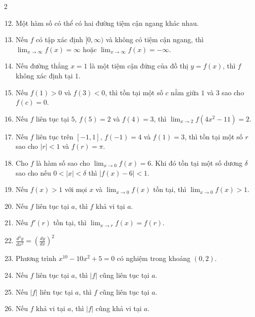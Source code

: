 \begin{multicols}{2}
\vspace{0.8em}

\begin{enumerate}[label=\textbf{\arabic*.}, leftmargin=1.8em, itemsep=1.1ex, topsep=0pt]
\setcounter{enumi}{11}
  \item Một hàm số có thể có hai đường tiệm cận ngang khác nhau.

  \item Nếu $f$ có tập xác định $[0, \infty)$ và không có tiệm cận ngang, thì $\lim_{x\to \infty} f(x) = \infty$ hoặc $\lim_{x\to \infty} f(x) = -\infty$.

  \item Nếu đường thẳng $x = 1$ là một tiệm cận đứng của đồ thị $y = f(x)$, thì $f$ không xác định tại $1$.

  \item Nếu $f(1) > 0$ và $f(3) < 0$, thì tồn tại một số $c$ nằm giữa $1$ và $3$ sao cho $f(c) = 0$.

  \item Nếu $f$ liên tục tại $5$, $f(5) = 2$ và $f(4) = 3$, thì $\lim_{x\to 2} f(4x^2 - 11) = 2$.

  \item Nếu $f$ liên tục trên $[-1, 1]$, $f(-1) = 4$ và $f(1) = 3$, thì tồn tại một số $r$ sao cho $|r| < 1$ và $f(r) = \pi$.

  \item Cho $f$ là hàm số sao cho $\lim_{x\to 0} f(x) = 6$. Khi đó tồn tại một số dương $\delta$ sao cho nếu $0 < |x| < \delta$ thì $|f(x) - 6| < 1$.

  \item Nếu $f(x) > 1$ với mọi $x$ và $\lim_{x\to 0} f(x)$ tồn tại, thì $\lim_{x\to 0} f(x) > 1$.

  \item Nếu $f$ liên tục tại $a$, thì $f$ khả vi tại $a$.

  \item Nếu $f'(r)$ tồn tại, thì $\lim_{x\to r} f(x) = f(r)$.

  \item $\displaystyle \frac{d^2y}{dx^2} = \left( \frac{dy}{dx} \right)^2$

  \item Phương trình $x^{10} - 10x^2 + 5 = 0$ có nghiệm trong khoảng $(0, 2)$.

  \item Nếu $f$ liên tục tại $a$, thì $|f|$ cũng liên tục tại $a$.

  \item Nếu $|f|$ liên tục tại $a$, thì $f$ cũng liên tục tại $a$.

  \item Nếu $f$ khả vi tại $a$, thì $|f|$ cũng khả vi tại $a$.
\end{enumerate}

\end{multicols}
